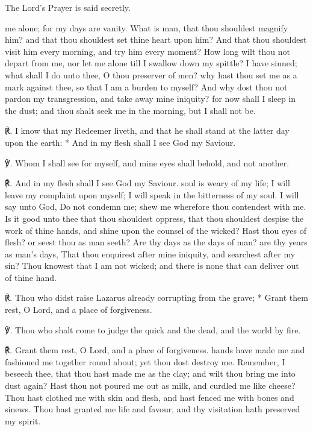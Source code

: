 \begin{rubric}
    {The Lord's Prayer is said secretly.}
\end{rubric}
 me alone; for my days are vanity. What is man, that thou shouldest magnify him? and that thou shouldest set thine heart upon him? And that thou shouldest visit him every morning, and try him every moment? How long wilt thou not depart from me, nor let me alone till I swallow down my spittle? I have sinned; what shall I do unto thee, O thou preserver of men? why hast thou set me as a mark against thee, so that I am a burden to myself? And why dost thou not pardon my transgression, and take away mine iniquity? for now shall I sleep in the dust; and thou shalt seek me in the morning, but I shall not be.
\par
℟. I know {\dag} that my Redeemer liveth, and that he shall stand at the latter day upon the earth: * And in my flesh shall I see God my Saviour.\par
℣. Whom I shall see for myself, and mine eyes shall behold, and not another.\par
℟. And in my flesh shall I see God my Saviour.
 soul is weary of my life; I will leave my complaint upon myself; I will speak in the bitterness of my soul. I will say unto God, Do not condemn me; shew me wherefore thou contendest with me. Is it good unto thee that thou shouldest oppress, that thou shouldest despise the work of thine hands, and shine upon the counsel of the wicked? Hast thou eyes of flesh? or seest thou as man seeth? Are thy days as the days of man? are thy years as man's days, That thou enquirest after mine iniquity, and searchest after my sin? Thou knowest that I am not wicked; and there is none that can deliver out of thine hand.\par
℟. Thou who didst raise Lazarus {\dag} already corrupting from the grave; * Grant them rest, O Lord, and a place of forgiveness.\par
℣. Thou who shalt come to judge the quick and the dead, and the world by fire.\par
℟. Grant them rest, O Lord, and a place of forgiveness.
 hands have made me and fashioned me together round about; yet thou dost destroy me. Remember, I beseech thee, that thou hast made me as the clay; and wilt thou bring me into dust again? Hast thou not poured me out as milk, and curdled me like cheese? Thou hast clothed me with skin and flesh, and hast fenced me with bones and sinews. Thou hast granted me life and favour, and thy visitation hath preserved my spirit.\par
